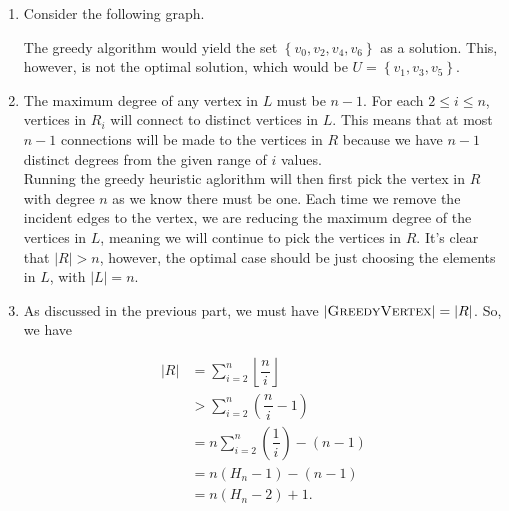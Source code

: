 \documentclass{article}
\begin{document}
\begin{solution}
\begin{enumerate}[label = (\alph*)]
    \item Consider the following graph.

 \begin{figure}[H]
 \centering
{}
    \end{figure}

The greedy algorithm would yield the set $ \left\{ v_0, v_2, v_4, v_6\right\}$ as a solution. This, however, is not the optimal solution, which would be $U = \left \{ v_1, v_3, v_5\right \}$.

    \item The maximum degree of any vertex in $L$ must be $n-1$. For each $2 \leq i \leq n$, vertices in $R_i$ will connect to distinct vertices in $L$.  This means that at most $n-1$ connections will be made to the vertices in $R$ because we have $n - 1$ distinct degrees from the given range of $i$ values.\\

Running the greedy heuristic aglorithm will then first pick the vertex in $R$ with degree $n$ as we know there must be one. Each time we remove the incident edges to the vertex, we are reducing the maximum degree of the vertices in $L$, meaning we will continue to pick the vertices in $R$. It's clear that $|R| > n$, however, the optimal case should be just choosing the elements in $L$, with $|L| = n$.

    \item As discussed in the previous part, we must have $\lvert \mathsf{\textsc{GreedyVertex}} \rvert = |R|$. So, we have

\begin{align*}
	|R| &= \sum_{i=2}^n \left \lfloor \dfrac{n}{i} \right \rfloor\\
	&> \sum_{i=2}^n \left( \dfrac{n}{i} - 1\right)\\
	&= n\sum_{i=2}^n\left( \dfrac{1}{i} \right) - (n-1)\\
	&= n(H_n - 1) - (n-1)\\
	&= n(H_n - 2) + 1.
\end{align*}


\end{enumerate}
\end{solution}
\end{document}
